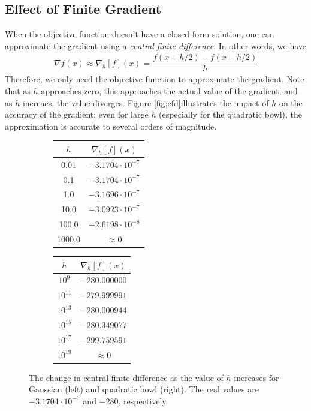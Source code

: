 \documentclass[10pt]{paper}
\begin{document}
\subsection{Effect of Finite Gradient}

When the objective function doesn't have a closed form solution, one can approximate the gradient using a \emph{central finite difference}. In other words, we have 
\begin{align*}
\nabla f(x) \approx \nabla_h[f](x) = \dfrac{f(x+h/2) - f(x-h/2)}{h}
\end{align*}
Therefore, we only need the objective function to approximate the gradient. Note that as $h$ approaches zero, this approaches the actual value of the gradient; and as $h$ increaes, the value diverges. Figure \ref{fig:cfd}illustrates the impact of $h$ on the accuracy of the gradient: even for large $h$ (especially for the quadratic bowl), the approximation is accurate to several orders of magnitude.

\begin{figure}[ht!]
  \centering
  \label{fig:cfd}
  \begin{subfigure}
    \centering
      \begin{tabular}{c | c}
      $h$  & $\nabla_h[f](x)$ \\  \hline
    0.01 & $-3.1704 \cdot 10^{-7}$ \\
    0.1 & $-3.1704 \cdot 10^{-7}$ \\
    1.0 & $-3.1696 \cdot 10^{-7}$ \\
    10.0 & $-3.0923 \cdot 10^{-7}$ \\
    100.0 & $-2.6198 \cdot 10^{-8}$ \\
    1000.0 & $\approx 0$ \\
      \end{tabular}
  \end{subfigure}
  \qquad
  \begin{subfigure}
    \centering
      \begin{tabular}{c | c}
      $h$  & $\nabla_h[f](x)$ \\  \hline
    $10^{9}$ & $-280.000000$ \\
    $10^{11}$ & $-279.999991$ \\
    $10^{13}$ & $-280.000944$ \\
    $10^{15}$ & $-280.349077$ \\
    $10^{17}$ & $-299.759591$ \\
    $10^{19}$ & $\approx 0$ \\
      \end{tabular}
  \end{subfigure}
  \caption{The change in central finite difference as the value of $h$ increases for Gaussian (left) and quadratic bowl (right). The real values are $-3.1704 \cdot 10^{-7}$ and $-280$, respectively.}
\end{figure}
\end{document}
